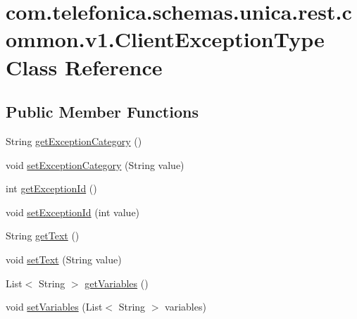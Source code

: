 \hypertarget{classcom_1_1telefonica_1_1schemas_1_1unica_1_1rest_1_1common_1_1v1_1_1ClientExceptionType}{
\section{com.telefonica.schemas.unica.rest.common.v1.ClientExceptionType Class Reference}
\label{classcom_1_1telefonica_1_1schemas_1_1unica_1_1rest_1_1common_1_1v1_1_1ClientExceptionType}
}
\subsection*{Public Member Functions}
\begin{DoxyCompactItemize}
\item 
String \hyperlink{classcom_1_1telefonica_1_1schemas_1_1unica_1_1rest_1_1common_1_1v1_1_1ClientExceptionType_a080e9267ee45f96e44cdcc72539134e6}{getExceptionCategory} ()
\item 
void \hyperlink{classcom_1_1telefonica_1_1schemas_1_1unica_1_1rest_1_1common_1_1v1_1_1ClientExceptionType_a4fb947134f067d1465b38a00ebea5489}{setExceptionCategory} (String value)
\item 
int \hyperlink{classcom_1_1telefonica_1_1schemas_1_1unica_1_1rest_1_1common_1_1v1_1_1ClientExceptionType_aafee7baf429d75c2ad554dc646965a44}{getExceptionId} ()
\item 
void \hyperlink{classcom_1_1telefonica_1_1schemas_1_1unica_1_1rest_1_1common_1_1v1_1_1ClientExceptionType_a5579468b22daa6ea4c2addfe0c53cc5f}{setExceptionId} (int value)
\item 
String \hyperlink{classcom_1_1telefonica_1_1schemas_1_1unica_1_1rest_1_1common_1_1v1_1_1ClientExceptionType_a22041bfb5e376af51c8d84e3605bee63}{getText} ()
\item 
void \hyperlink{classcom_1_1telefonica_1_1schemas_1_1unica_1_1rest_1_1common_1_1v1_1_1ClientExceptionType_ab31df0248f55d91ec2fc21250ecfb6d1}{setText} (String value)
\item 
List$<$ String $>$ \hyperlink{classcom_1_1telefonica_1_1schemas_1_1unica_1_1rest_1_1common_1_1v1_1_1ClientExceptionType_a3702a26de9781e65a55d94776be7aabb}{getVariables} ()
\item 
void \hyperlink{classcom_1_1telefonica_1_1schemas_1_1unica_1_1rest_1_1common_1_1v1_1_1ClientExceptionType_aff7b9748d1619634288036b699afb7ea}{setVariables} (List$<$ String $>$ variables)
\end{DoxyCompactItemize}

